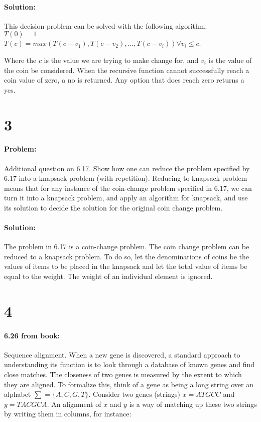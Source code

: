 \documentclass[12pt]{article}
\begin{document}
\paragraph{Solution:}
This decision problem can be solved with the following algorithm:
\\    $T(0) = 1$
\\    $T(c) = max(T(c-v_1),T(c-v_2),\dots,T(c-v_i)) \forall v_i \le c$.

Where the $c$ is the value we are trying to make change for, and $v_i$ is the
value of the coin be considered.  When the recursive function cannot
successfully reach a coin value of zero, a no is returned. Any option that does
reach zero returns a yes.

\section*{3}
\paragraph{Problem:}
Additional question on 6.17. Show how one can reduce the problem specified by
6.17 into a knapsack problem (with repetition). Reducing to knapsack problem
means that for any instance of the coin-change problem specified in 6.17, we
can turn it into a knapsack problem, and apply an algorithm for knapsack, and
use its solution to decide the solution for the original coin change problem.
\paragraph{Solution:}

The problem in 6.17 is a coin-change problem. The coin change problem
can be reduced to a knapsack problem. To do so, let the denominations of
coins be the values of items to be placed in the knapsack and let the
total value of items be equal to the weight. The weight of an individual
element is ignored.

\section*{4}
\paragraph{6.26 from book:}
Sequence alignment. When a new gene is discovered, a standard approach to
understanding its function is to look through a database of known genes and
find close matches. The closeness of two genes is measured by the extent to 
which they are aligned. To formalize this, think of a gene as being a long
string over an alphabet $\sum = \{A, C, G, T\}$. Consider two genes (strings)
$x = AT GCC$ and $y = T ACGCA$. An alignment of $x$ and $y$ is a way of matching up
these two strings by writing them in columns, for instance:
\end{document}
